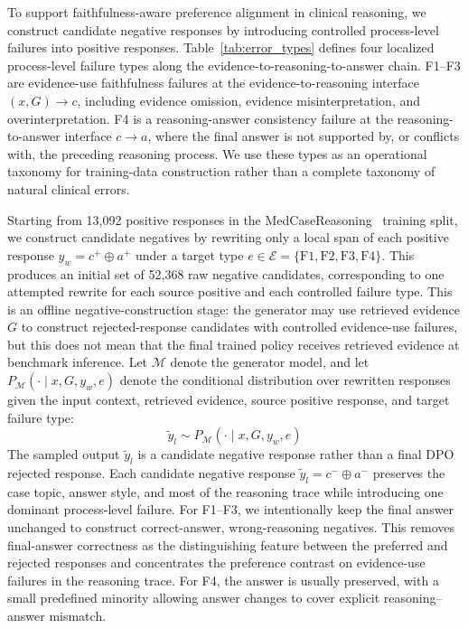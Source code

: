 \documentclass[a4paper,fleqn,doubleblind]{cas-sc}
\begin{document}
To support faithfulness-aware preference alignment in clinical reasoning, we construct candidate negative responses by introducing controlled process-level failures into positive responses.
Table~\ref{tab:error_types} defines four localized process-level failure types along the evidence-to-reasoning-to-answer chain. F1--F3 are evidence-use faithfulness failures at the evidence-to-reasoning interface $(x,G)\rightarrow c$, including evidence omission, evidence misinterpretation, and overinterpretation. F4 is a reasoning-answer consistency failure at the reasoning-to-answer interface $c\rightarrow a$, where the final answer is not supported by, or conflicts with, the preceding reasoning process. We use these types as an operational taxonomy for training-data construction rather than a complete taxonomy of natural clinical errors.

Starting from 13,092 positive responses in the MedCaseReasoning~\cite{wu2025medcasereasoning} training split, we construct candidate negatives by rewriting only a local span of each positive response $y_w = c^{+} \oplus a^{+}$ under a target type $e \in \mathcal{E} = \{\text{F1}, \text{F2}, \text{F3}, \text{F4}\}$. This produces an initial set of 52,368 raw negative candidates, corresponding to one attempted rewrite for each source positive and each controlled failure type. This is an offline negative-construction stage: the generator may use retrieved evidence $G$ to construct rejected-response candidates with controlled evidence-use failures, but this does not mean that the final trained policy receives retrieved evidence at benchmark inference. Let $\mathcal{M}$ denote the generator model, and let $P_{\mathcal{M}}(\cdot \mid x, G, y_w, e)$ denote the conditional distribution over rewritten responses given the input context, retrieved evidence, source positive response, and target failure type:
\begin{equation}
\tilde{y}_l \sim P_{\mathcal{M}}(\cdot \mid x, G, y_w, e)
\end{equation}
The sampled output $\tilde{y}_l$ is a candidate negative response rather than a final DPO rejected response. Each candidate negative response $\tilde{y}_l=c^{-}\oplus a^{-}$ preserves the case topic, answer style, and most of the reasoning trace while introducing one dominant process-level failure. For F1--F3, we intentionally keep the final answer unchanged to construct correct-answer, wrong-reasoning negatives. This removes final-answer correctness as the distinguishing feature between the preferred and rejected responses and concentrates the preference contrast on evidence-use failures in the reasoning trace. For F4, the answer is usually preserved, with a small predefined minority allowing answer changes to cover explicit reasoning--answer mismatch.
\end{document}
